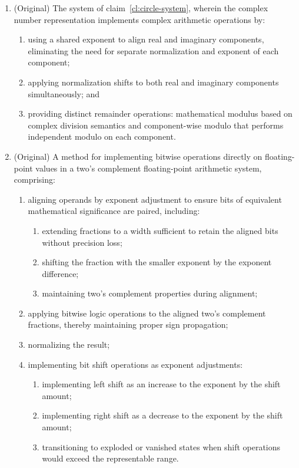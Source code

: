 \documentclass[12pt,letter]{article}
\begin{document}
\begin{enumerate}
    \item (Original) The system of claim~\ref{cl:circle-system}, wherein the complex number representation implements complex arithmetic operations by:
          \begin{enumerate}
              \item using a shared exponent to align real and imaginary components, eliminating the need for separate normalization and exponent of each component;
              \item applying normalization shifts to both real and imaginary components simultaneously; and
              \item providing distinct remainder operations: mathematical modulus based on complex division semantics and component-wise modulo that performs independent modulo on each component.
          \end{enumerate}

          \item\label{cl:bitwise-method} (Original) A method for implementing bitwise operations directly on floating-point values in a two's complement floating-point arithmetic system, comprising:
          \begin{enumerate}
              \item aligning operands by exponent adjustment to ensure bits of equivalent mathematical significance are paired, including:
                    \begin{enumerate}
                        \item extending fractions to a width sufficient to retain the aligned bits without precision loss;
                        \item shifting the fraction with the smaller exponent by the exponent difference;
                        \item maintaining two's complement properties during alignment;
                    \end{enumerate}
              \item applying bitwise logic operations to the aligned two's complement fractions, thereby maintaining proper sign propagation;
              \item normalizing the result;
              \item implementing bit shift operations as exponent adjustments:
                    \begin{enumerate}
                        \item implementing left shift as an increase to the exponent by the shift amount;
                        \item implementing right shift as a decrease to the exponent by the shift amount;
                        \item transitioning to exploded or vanished states when shift operations would exceed the representable range.
                    \end{enumerate}
          \end{enumerate}


\end{enumerate}
\end{document}
